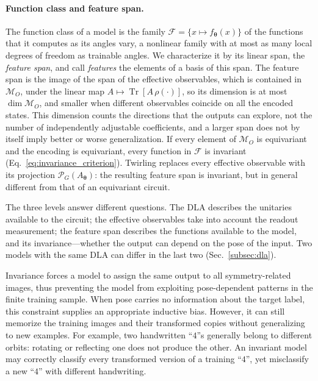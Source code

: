 \documentclass[aps,pra,reprint,superscriptaddress,longbibliography]{revtex4-2}
\newcommand{\tr}{\operatorname{Tr}}
\begin{document}
\paragraph{Function class and feature span.} The function class of a model is the family $\mathcal F=\{x\mapsto f_{\boldsymbol\theta}(x)\}$ of the functions that it computes as its angles vary, a nonlinear family with at most as many local degrees of freedom as trainable angles. We characterize it by its linear span, the \emph{feature span}, and call \emph{features} the elements of a basis of this span. The feature span is the image of the span of the effective observables, which is contained in $\mathcal M_O$, under the linear map $A\mapsto\tr[A\,\rho(\cdot)]$, so its dimension is at most $\dim\mathcal M_O$, and smaller when different observables coincide on all the encoded states. This dimension counts the directions that the outputs can explore, not the number of independently adjustable coefficients, and a larger span does not by itself imply better or worse generalization. If every element of $\mathcal M_O$ is equivariant and the encoding is equivariant, every function in $\mathcal F$ is invariant (Eq.~\eqref{eq:invariance_criterion}). Twirling replaces every effective observable with its projection $\mathcal P_G(A_{\boldsymbol\theta})$: the resulting feature span is invariant, but in general different from that of an equivariant circuit.

The three levels answer different questions. The DLA describes the unitaries available to the circuit; the effective observables take into account the readout measurement; the feature span describes the functions available to the model, and its invariance---whether the output can depend on the pose of the input. Two models with the same DLA can differ in the last two (Sec.~\ref{subsec:dla}).

Invariance forces a model to assign the same output to all symmetry-related images, thus preventing the model from exploiting pose-dependent patterns in the finite training sample. When pose carries no information about the target label, this constraint supplies an appropriate inductive bias. However, it can still memorize the training images and their transformed copies without generalizing to new examples. For example, two handwritten ``$4$''s generally belong to different orbits: rotating or reflecting one does not produce the other. An invariant model may correctly classify every transformed version of a training ``$4$'', yet misclassify a new ``$4$'' with different handwriting.
\end{document}
